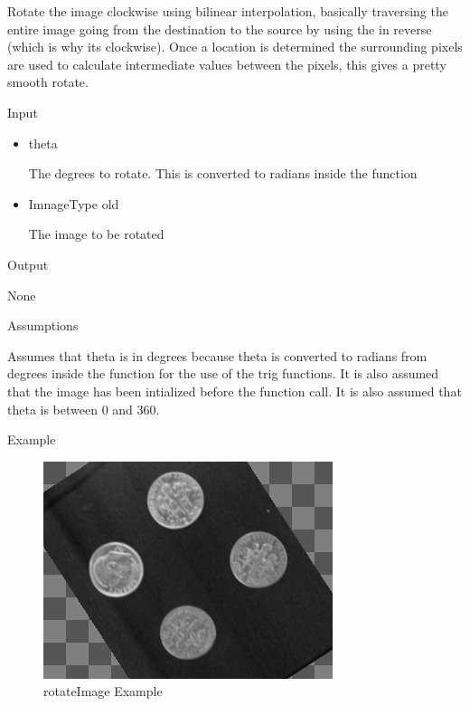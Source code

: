 \documentclass[pdftex, 11pt]{article}
\begin{document}
\begin{description}
\begin{description}
				Rotate the image clockwise using bilinear
				interpolation, basically traversing
				the entire image going from the destination 
				to the source by using the
				in reverse (which is why its clockwise). 
				Once a location is determined the
				surrounding pixels are used to calculate 
				intermediate values between the
				pixels, this gives a pretty smooth rotate.

			\item{Input}

				\begin{itemize}

					\item{theta}

						The degrees to rotate. This is converted
						to radians inside the function

					\item{ImnageType old}

						The image to be rotated

				\end{itemize}

			\item{Output}

				None

			\item{Assumptions}

				Assumes that theta is in degrees because theta is
				converted to radians from degrees inside the function
				for the use of the trig functions.
				It is also assumed that the image has been intialized
				before the function call. It is also assumed that theta
				is between 0 and 360.

			\item{Example}

				\begin{figure}[ht!]
					\centering
					\caption{rotateImage Example}
				\includegraphics{images/outrotate.png}
			\end{figure}


\end{description}
\end{description}
\end{document}
